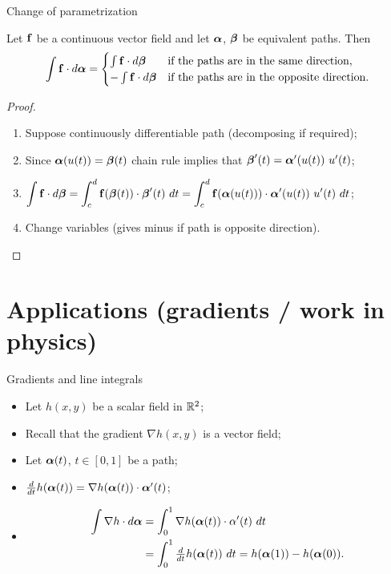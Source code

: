 {Change of parametrization}

\begin{theorem}
    Let \(\mathbf{f}\) be a continuous vector field and let \(\boldsymbol{\alpha}\), \(\boldsymbol{\beta}\) be equivalent paths.
    Then
    \[
        \int \mathbf{f} \cdot d\boldsymbol{\alpha} =
        \begin{cases}
            \int \mathbf{f} \cdot d\boldsymbol{\beta}   & \text{if the paths are in the same direction},     \\
            - \int \mathbf{f} \cdot d\boldsymbol{\beta} & \text{if the paths are in the opposite direction}.
        \end{cases}
    \]
\end{theorem}

\begin{proof}
    \begin{enumerate}
        \item Suppose continuously differentiable path (decomposing if required);
        \item Since \(\boldsymbol{\alpha}(u(t)) = \boldsymbol{\beta}(t)\) chain rule implies that
              \( \bbeta'(t) = \aalpha'(u(t)) \ u'(t)\);
        \item
              \(\displaystyle \int \ff \cdot  d\bbeta = \displaystyle \int_c^d \ff(\bbeta(t)) \cdot \bbeta'(t) \ dt =  \displaystyle \int_c^d \ff(\aalpha(u(t))) \cdot \aalpha'(u(t)) \ u'(t) \ dt \);
        \item Change variables (gives minus if path is opposite direction). \qedhere
    \end{enumerate}
\end{proof}


\section{Applications (gradients / work in physics)}


 {Gradients and line integrals}

\begin{itemize}
    \item Let \(h(x,y)\) be a scalar field in \(\mathbb{R}^2\);
    \item Recall that the gradient \(\nabla h(x,y)\) is a vector field;
    \item Let \(\boldsymbol{\alpha}(t)\), \(t\in [0,1]\) be a path;
    \item \(\frac{d}{dt} h(\boldsymbol{\alpha}(t)) = \nabla h(\boldsymbol{\alpha}(t))\cdot \boldsymbol{\alpha}'(t)\);
    \item \[
              \begin{aligned}
                  \int \nabla h \cdot d\boldsymbol{\alpha}
                   & = \int_0^1 \nabla h(\boldsymbol{\alpha}(t)) \cdot \alpha'(t)\ dt \\
                   & = \int_0^1 \tfrac{d}{dt} h(\boldsymbol{\alpha}(t)) \ dt
                  = h(\boldsymbol{\alpha}(1)) - h(\boldsymbol{\alpha}(0)).
              \end{aligned}
          \]
\end{itemize}




